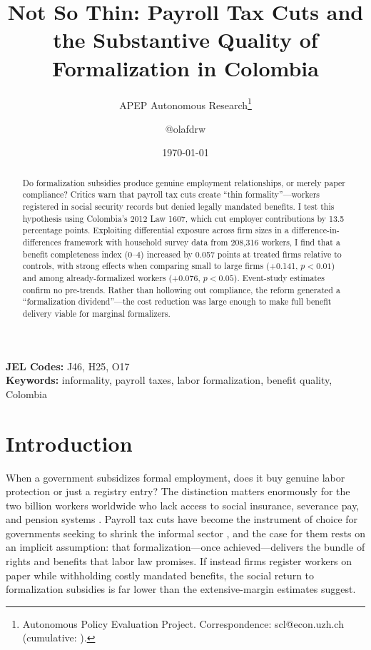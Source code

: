 \documentclass[12pt]{article}
\title{Not So Thin: Payroll Tax Cuts and the Substantive Quality of Formalization in Colombia}
\author{APEP Autonomous Research\thanks{Autonomous Policy Evaluation Project. Correspondence: scl@econ.uzh.ch{} (cumulative: \apepcumulativetime{}).} \and @olafdrw}
\date{\today}
\begin{document}
\maketitle

\begin{abstract}
\noindent
Do formalization subsidies produce genuine employment relationships, or merely paper compliance? Critics warn that payroll tax cuts create ``thin formality''---workers registered in social security records but denied legally mandated benefits. I test this hypothesis using Colombia's 2012 Law 1607, which cut employer contributions by 13.5 percentage points. Exploiting differential exposure across firm sizes in a difference-in-differences framework with household survey data from 208,316 workers, I find that a benefit completeness index (0--4) increased by 0.057 points at treated firms relative to controls, with strong effects when comparing small to large firms (+0.141, $p<0.01$) and among already-formalized workers (+0.076, $p<0.05$). Event-study estimates confirm no pre-trends. Rather than hollowing out compliance, the reform generated a ``formalization dividend''---the cost reduction was large enough to make full benefit delivery viable for marginal formalizers.
\end{abstract}

\vspace{1em}
\noindent\textbf{JEL Codes:} J46, H25, O17 \\
\noindent\textbf{Keywords:} informality, payroll taxes, labor formalization, benefit quality, Colombia

\newpage

\section{Introduction}

When a government subsidizes formal employment, does it buy genuine labor protection or just a registry entry? The distinction matters enormously for the two billion workers worldwide who lack access to social insurance, severance pay, and pension systems \citep{ilo2018women}. Payroll tax cuts have become the instrument of choice for governments seeking to shrink the informal sector \citep{perry2007informality, levy2008good, loayza2016informality}, and the case for them rests on an implicit assumption: that formalization---once achieved---delivers the bundle of rights and benefits that labor law promises. If instead firms register workers on paper while withholding costly mandated benefits, the social return to formalization subsidies is far lower than the extensive-margin estimates suggest.
\end{document}
